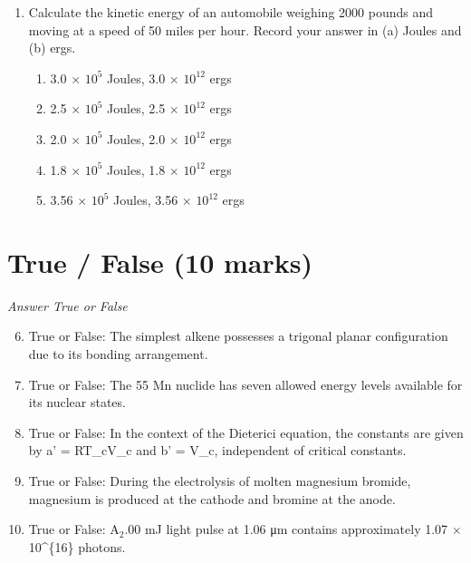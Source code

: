 \documentclass[12pt]{article}
\begin{document}
\begin{enumerate}[label=\arabic*.]
\begin{enumerate}[label=(\alph*)]
    \item 1.75
    \item 3.50
    \item 14.00
    \item 10.00
    \item 12.00
\end{enumerate}
\item Calculate the kinetic energy of an automobile weighing 2000 pounds and moving at a speed of 50 miles per hour. Record your answer in (a) Joules and (b) ergs.
\begin{enumerate}[label=(\alph*)]
    \item 3.0 \ensuremath{\times} $10^5$ Joules, 3.0 \ensuremath{\times} $10^12$ ergs
    \item 2.5 \ensuremath{\times} $10^5$ Joules, 2.5 \ensuremath{\times} $10^12$ ergs
    \item 2.0 \ensuremath{\times} $10^5$ Joules, 2.0 \ensuremath{\times} $10^12$ ergs
    \item 1.8 \ensuremath{\times} $10^5$ Joules, 1.8 \ensuremath{\times} $10^12$ ergs
    \item 3.56 \ensuremath{\times} $10^5$ Joules, 3.56 \ensuremath{\times} $10^12$ ergs
\end{enumerate}
\end{enumerate}

\section*{True / False (10 marks)}
\textit{Answer True or False}
\begin{enumerate}[label=\arabic*.]
\setcounter{enumi}{5}
\item True or False: The simplest alkene possesses a trigonal planar configuration due to its bonding arrangement.
\item True or False: The 55 Mn nuclide has seven allowed energy levels available for its nuclear states.
\item True or False: In the context of the Dieterici equation, the constants are given by a' = RT\_cV\_c and b' = V\_c, independent of critical constants.
\item True or False: During the electrolysis of molten magnesium bromide, magnesium is produced at the cathode and bromine at the anode.
\item True or False: A$_{2}$.00 mJ light pulse at 1.06 μm contains approximately 1.07 \ensuremath{\times} 10^\{16\} photons.
\end{enumerate}
\end{document}
